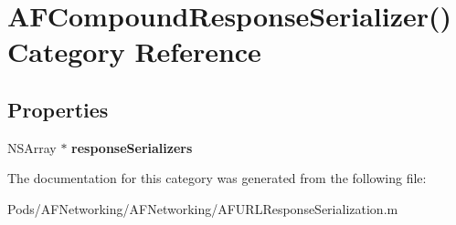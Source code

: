 \hypertarget{category_a_f_compound_response_serializer_07_08}{}\section{A\+F\+Compound\+Response\+Serializer() Category Reference}
\label{category_a_f_compound_response_serializer_07_08}
\subsection*{Properties}
\begin{DoxyCompactItemize}
\item 
\mbox{\label{category_a_f_compound_response_serializer_07_08_a98e93971964f9964ec57bbbf28211577}} 
N\+S\+Array $\ast$ {\bfseries response\+Serializers}
\end{DoxyCompactItemize}


The documentation for this category was generated from the following file\+:\begin{DoxyCompactItemize}
\item 
Pods/\+A\+F\+Networking/\+A\+F\+Networking/A\+F\+U\+R\+L\+Response\+Serialization.\+m\end{DoxyCompactItemize}
